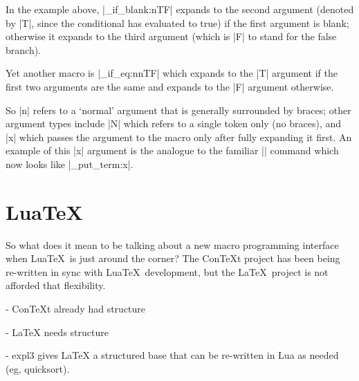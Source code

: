 \documentclass[final]{ltugboat}
\begin{document}
In the example above, |\tlist_if_blank:nTF| expands to the second argument (denoted by |T|, since the conditional has evaluated to true) if the first argument is blank; otherwise it expands to the third argument (which is |F| to stand for the false branch).

Yet another macro is |\tlist_if_eq:nnTF| which expands to the |T| argument if the first two arguments are the same and expands to the |F| argument otherwise.

So |n| refers to a `normal' argument that is generally surrounded by braces; other argument types include |N| which refers to a single token only (no braces), and |x| which passes the argument to the macro only after fully expanding it first. An example of this |x| argument is the analogue to the familiar |\typeout| command which now looks like |\io_put_term:x|.

\section{Lua\TeX}

So what does it mean to be talking about a new macro programming interface when Lua\TeX\ is just around the corner? The Con\TeX{}t project has been being re-written in sync with Lua\TeX\ development, but the \LaTeX\ project is not afforded that flexibility.

- ConTeXt already had structure

- LaTeX needs structure

- expl3 gives LaTeX a structured base that can be re-written in Lua as needed (eg, quicksort).
\end{document}
